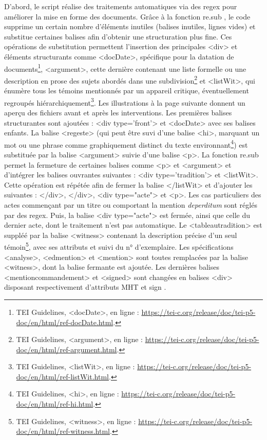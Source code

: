 \par D'abord, le script réalise des traitements automatiques via des regex pour améliorer la mise en forme des documents. Grâce à la fonction \og re.sub \fg, le code supprime un certain nombre d'éléments inutiles (balises inutiles, lignes vides) et substitue certaines balises afin d'obtenir une structuration plus fine. Ces opérations de substitution permettent l'insertion des principales <div> et éléments structurants comme <docDate>, spécifique pour la datation de documents\footnote{TEI Guidelines, <docDate>, en ligne : \url{https://tei-c.org/release/doc/tei-p5-doc/en/html/ref-docDate.html}.}, <argument>, cette dernière contenant une liste formelle ou une description en prose des sujets abordés dans une subdivision\footnote{TEI Guidelines, <argument>, en ligne : \url{https://tei-c.org/release/doc/tei-p5-doc/en/html/ref-argument.html}.} et <listWit>, qui énumère tous les témoins mentionnés par un appareil critique, éventuellement regroupés hiérarchiquement\footnote{TEI Guidelines, <listWit>, en ligne : \url{https://tei-c.org/release/doc/tei-p5-doc/en/html/ref-listWit.html}.}. Les illustrations à la page suivante donnent un aperçu des fichiers avant et après les interventions. Les premières balises structurantes sont ajoutées : <div type='front'> et <docDate> avec ses balises enfants. La balise <regeste> (qui peut être suvi d'une balise <hi>, marquant un mot ou une phrase comme graphiquement distinct du texte environnant\footnote{TEI Guidelines, <hi>, en ligne : \url{https://tei-c.org/release/doc/tei-p5-doc/en/html/ref-hi.html}.}) est substituée par la balise <argument> suivie d'une balise <p>. La fonction \og re.sub \fg permet la fermeture de certaines balises comme <p> et <argument> et d'intégrer les balises ouvrantes suivantes : <div type='tradition'> et <listWit>. Cette opération est répétée afin de fermer la balise </listWit> et d'ajouter les suivantes : </div>, </div>, <div type="acte"> et <p>. Les cas particuliers des actes commençant par un titre ou comportant la mention \textit{deperditum} sont réglés par des regex. Puis, la balise <div type="acte"> est fermée, ainsi que celle du dernier acte, dont le traitement n'est pas automatique. Le <tableautradition> est suppléé par la balise <witness> contenant la description précise d’un seul témoin\footnote{TEI Guidelines, <witness>, en ligne : \url{https://tei-c.org/release/doc/tei-p5-doc/en/html/ref-witness.html}.}, avec ses attributs et suivi du n° d'exemplaire. Les spécifications <analyse>, <edmention> et <mention> sont toutes remplacées par la balise <witness>, dont la balise fermante est ajoutée. Les dernières balises <mentioncommandement> et <signed> sont changées en balises <div> disposant respectivement d'attributs \og MHT \fg \space et \og sign \fg. 
\newpage

